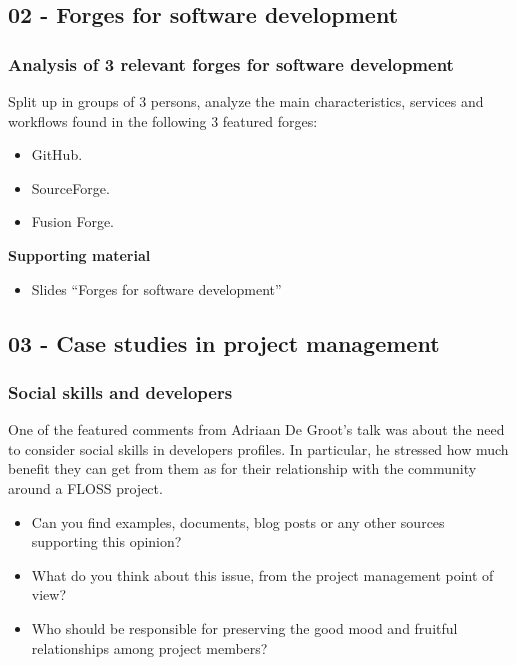 \documentclass[a4paper]{article}
\begin{document}
\subsection{02 - Forges for software development}

\subsubsection{Analysis of 3 relevant forges for software development}
\label{sub:forges-analysis}

Split up in groups of 3 persons, analyze the main characteristics, services and workflows found in the following 3 featured forges:

\begin{itemize}
 \item GitHub.
 \item SourceForge.
 \item Fusion Forge.
\end{itemize}

\textbf{Supporting material}

\begin{itemize}
\item Slides ``Forges for software development''
\end{itemize}

\subsection{03 - Case studies in project management}

\subsubsection{Social skills and developers}
\label{sub:social-skills}

One of the featured comments from Adriaan De Groot's talk was about the need to consider social skills 
in developers profiles. In particular, he stressed how much benefit they can get from them as for their 
relationship with the community around a FLOSS project.

\begin{itemize}
 \item Can you find examples, documents, blog posts or any other sources supporting this opinion?
 \item What do you think about this issue, from the project management point of view?
 \item Who should be responsible for preserving the good mood and fruitful relationships among project members?
\end{itemize}
\end{document}
